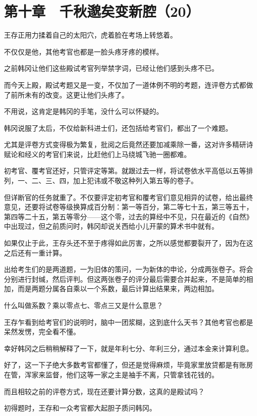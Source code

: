 \section{第十章　千秋邈矣变新腔（20）}

王存正用力揉着自己的太阳穴，虎着脸在考场上转悠着。

不仅仅是他，其他考官也都是一脸头疼牙疼的模样。

之前韩冈让他们这些殿试考官列举禁字词，已经让他们感到头疼不已。

而今天上殿，殿试考题又是一变，不仅加了一道体例不明的考题，连评卷方式都做了前所未有的改变。这更让他们头疼了。

不用说，这肯定是韩冈的手笔，没什么可以怀疑的。

韩冈说服了太后，不仅给新科进士们，还包括给考官们，都出了一个难题。

尤其是评卷方式变得极为繁复，批阅之后竟然还要加减乘除一番，这对许多精研诗赋论和经义的考官们来说，比赶他们上马绕城飞驰一圈都难。

初考官、覆考官还好，只管评定等第。就跟过去一样，将试卷依水平高低以五等排列，一、二、三、四，加上犯讳或不敬这种列入第五等的卷子。

但详断官的任务就重了。不仅要评定初考官和覆考官们意见相异的试卷，给出最终意见，还要将试卷等级换算成百分制：第一等百分，第二等七十五，第三等五十，第四等二十五，第五等零分——这个零，过去的算经中不见，只在最近的《自然》中出现过，但之前质问时，韩冈却说关西给小儿开蒙的算术书中就有。

如果仅止于此，王存头还不至于疼得如此厉害，之所以感觉都要裂开了，因为在这之后还有一重计算。

出给考生们的是两道题，一为旧体的策问，一为新体的申论，分成两张卷子。将会分别进行封缄，然后评判。但这两张卷子的评分最后需要合并起来，不是简单的相加，而是两题分属各自乘以一个系数，最后计算出结果来，两边相加。

什么叫做系数？乘以零点七、零点三又是什么意思？

王存乍看到给考官们的说明时，脑中一团浆糊，这到底什么天书？其他考官也都是呆然发愣，完全看不懂。

幸好韩冈之后稍稍解释了一下，就是年利七分、年利三分，通过本金来计算利息。

好了，这一下子绝大多数考官都懂了，但还是觉得麻烦，毕竟家里放贷都是有账房在管，浑家来监督，他们这等一家之主是袖手不离，只管拿钱花钱的。

而且相较之前的评卷方式，现在还要计算分数，这真的是殿试吗？

初得题时，王存和一众考官都大起胆子质问韩冈。

